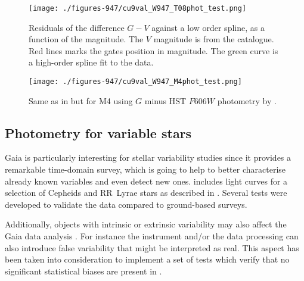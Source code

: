 \begin{figure}
\centering
\texttt{[image: ./figures-947/cu9val\_W947\_T08phot\_test.png]}
\caption[$G-V$ vs magnitude for open clusters]{Residuals of the difference $G-V$ against a low order spline, as a function of  the magnitude. The $V$ magnitude is from the \cite{2008ApJS..176..262T} catalogue. Red lines marks the gates position in magnitude. The green curve is a high-order spline fit to the data.} \label{fig:cu9val_W947_T08phot_test}
\end{figure}

  

\begin{figure}
\centering
\texttt{[image: ./figures-947/cu9val\_W947\_M4phot\_test.png]}
\caption[HST $F606W$ photometry for M4]{Same as in  but for M4 using $G$ minus HST $F606W$ photometry by \cite{2014MNRAS.442.2381N}.} \label{fig:cu9val_W947_M4phot_test}
\end{figure}





\subsection{Photometry for variable stars}\label{sec:variables}


Gaia is particularly interesting for stellar variability studies since it provides a remarkable time-domain survey, which is going to help to better characterise already known variables and even detect new ones. {} includes light curves for a selection of Cepheids and RR~Lyrae stars as described in \cite{DPACP-15,DPACP-13}. Several tests were developed to validate the data compared to ground-based surveys.

Additionally, objects with intrinsic or extrinsic variability may also affect the Gaia data analysis \citep{2000ASPC..210..482E}. For instance
the instrument and/or the data processing can also introduce false variability that might be interpreted as real. This aspect has been taken into consideration to implement a set of tests which verify that no significant statistical biases are present in {}.


